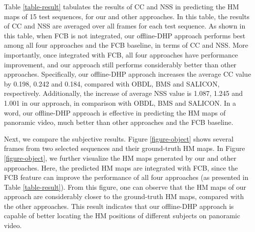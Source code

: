 \documentclass[10pt,journal,compsoc]{IEEEtran}
\begin{document}
Table \ref{table-result} tabulates the results of CC and NSS in predicting the HM maps of 15 test sequences, for our and other approaches.
In this table, the results of CC and NSS are averaged over all frames for each test sequence.
As shown in this table, when FCB is not integrated, our offline-DHP approach performs best among all four approaches and the FCB baseline, in terms of CC and NSS.
More importantly, once integrated with FCB, all four approaches have performance improvement, and our approach still performs considerably better than other approaches.
Specifically, our offline-DHP approach increases the average CC value by 0.198, 0.242 and 0.184, compared with OBDL, BMS and SALICON, respectively.
Additionally, the increase of average NSS value is 1.087, 1.245 and 1.001 in our approach, in comparison with OBDL, BMS and SALICON.
In a word, our offline-DHP approach is effective in predicting the HM maps of panoramic video, much better than other approaches and the FCB baseline.




Next, we compare the subjective results. Figure \ref{figure-object} shows several frames from two selected sequences and their ground-truth HM maps.
In Figure \ref{figure-object}, we further visualize the HM maps generated by our and other approaches. Here, the predicted HM maps are integrated with FCB, since the FCB feature can improve the performance of all four approaches (as presented in Table \ref{table-result}).
From this figure, one can observe that the HM maps of our approach are considerably closer to the ground-truth HM maps, compared with the other approaches.
This result indicates that our offline-DHP approach is capable of better locating the HM positions of different subjects on panoramic video.
\end{document}
